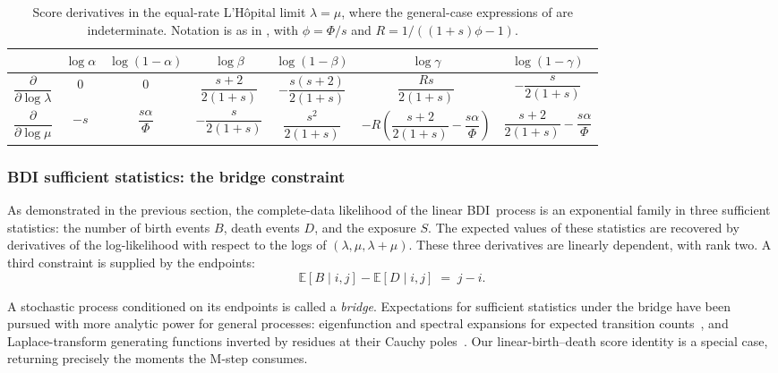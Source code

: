 \documentclass[11pt]{article}
\newcommand{\BDI}{\textsc{BDI}}
\newcommand{\E}{\mathbb{E}}
\newcommand{\ins}{\lambda}
\newcommand{\del}{\mu}
\begin{document}
\begin{table}[t]
	\caption{Score derivatives in the equal-rate L'H\^opital limit $\ins{=}\del$, where the
		general-case expressions of  are indeterminate. Notation is
		as in , with $\phi{=}\Phi/s$ and $R{=}1/((1{+}s)\phi-1)$.}
	\label{tab:score-derivatives-equal}
	\centering
	\setlength{\tabcolsep}{4pt}
	\begin{tabular}{ccccccc}
		\toprule
		& $\log\alpha$ & $\log(1{-}\alpha)$ & $\log\beta$
		& $\log(1{-}\beta)$ & $\log\gamma$ & $\log(1{-}\gamma)$ \\
		\midrule
		$\dfrac{\partial}{\partial\log\ins}$
		& $0$ & $0$
		& $\dfrac{s+2}{2(1+s)}$
		& $-\dfrac{s(s+2)}{2(1+s)}$
		& $\dfrac{Rs}{2(1+s)}$
		& $-\dfrac{s}{2(1+s)}$ \\
		$\dfrac{\partial}{\partial\log\del}$
		& $-s$ & $\dfrac{s\alpha}{\Phi}$
		& $-\dfrac{s}{2(1+s)}$
		& $\dfrac{s^2}{2(1+s)}$
		& $-R\!\left(\dfrac{s{+}2}{2(1{+}s)}-\dfrac{s\alpha}{\Phi}\right)$
		& $\dfrac{s+2}{2(1+s)}-\dfrac{s\alpha}{\Phi}$ \\
		\bottomrule
	\end{tabular}
\end{table}

\subsubsection{BDI sufficient statistics: the bridge constraint}

As demonstrated in the previous section, the complete-data likelihood of the 
linear \BDI\ process is an exponential family in three sufficient statistics: 
the number of birth events $B$, death events $D$, and the exposure $S$.
The expected values of these statistics are recovered by derivatives of the log-likelihood with respect to the logs of $(\ins,\del,\ins{+}\del)$.
These three derivatives are linearly dependent, with rank two. A third constraint is supplied by the endpoints:
\begin{equation}
\label{eq:conservation}
\E[B\mid i,j]-\E[D\mid i,j]\;=\;j-i .
\end{equation}

A stochastic process conditioned on its endpoints is called a \emph{bridge}.
Expectations for sufficient statistics under the bridge have been
pursued with more analytic power for general processes: eigenfunction
and spectral expansions for expected transition
counts~\citep{MininSuchard2008}, and Laplace-transform generating
functions inverted by residues at their Cauchy
poles~\citep{CrawfordSuchard2012,CrawfordMininSuchard2014}. Our
linear-birth--death score identity is a special case,
returning precisely the moments the M-step consumes. 
\end{document}
